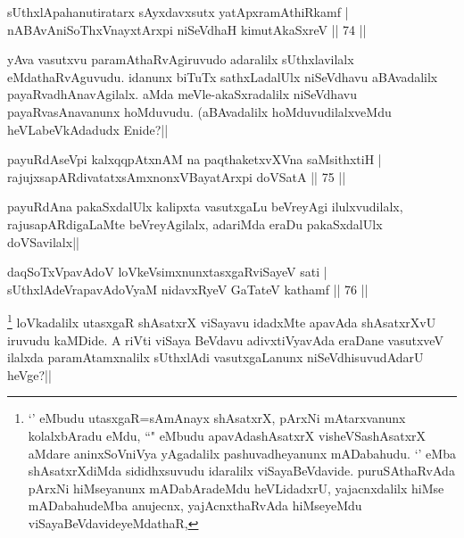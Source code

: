
\begin{shl}
sUthxlApahanutiratarx sAyxdavxsutx yatApxramAthiRkamf |\\
nABAvAniSoThxV\s nayxtArxpi niSeVdhaH kimutAkaSxreV \hfill || 74 ||
\end{shl}

\begin{artha}
yAva vasutxvu paramAthaRvAgiruvudo adaralilx sUthxlavilalx eMdathaRvAguvudu. idanunx biTuTx sathxLadalUlx niSeVdhavu aBAvadalilx payaRvadhAnavAgilalx. aMda meVle-akaSxradalilx niSeVdhavu payaRvasAnavanunx hoMduvudu. (aBAvadalilx hoMduvudilalxveMdu heVLabeVkAdadudx Enide?||
\end{artha}

\begin{shl}
payuRdAseV\s pi kalxqqpAtxnAM na paqthaketxvXVna saMsithxtiH |\\
rajujxsapARdivatatxsAmxnonxVBayatArxpi doVSatA \hfill || 75 ||
\end{shl}

\begin{artha}%
payuRdAna pakaSxdalUlx kalipxta vasutxgaLu beVreyAgi ilulxvudilalx, rajusapARdigaLaMte beVreyAgilalx, adariMda eraDu pakaSxdalUlx doVSavilalx||
\end{artha}


\begin{shl}
daqSoTxV\s pavAdoV loVkeV\s simxnunxtasxgaRviSayeV sati |\\
sUthxlAdeVrapavAdoV\s yaM nidavxRyeV GaTateV kathamf \hfill || 76 ||
\end{shl}

\begin{artha}
\footnote[1]{`\stext ' eMbudu utasxgaR=sAmAnayx shAsatxrX, pArxNi mAtarxvanunx kolalxbAradu eMdu, ``\stext " eMbudu apavAdashAsatxrX visheVSashAsatxrX aMdare aninxSoVniVya yAgadalilx pashuvadheyanunx mADabahudu. `\stext ' eMba shAsatxrXdiMda sididhxsuvudu idaralilx viSayaBeVdavide. puruSAthaRvAda pArxNi hiMseyanunx mADabAradeMdu heVLidadxrU, yajacnxdalilx hiMse mADabahudeMba anujecnx, yajAcnxthaRvAda hiMseyeMdu viSayaBeVdavideyeMdathaR,} loVkadalilx utasxgaR shAsatxrX viSayavu idadxMte apavAda shAsatxrXvU iruvudu kaMDide. A riVti viSaya BeVdavu adivxtiVyavAda  eraDane vasutxveV ilalxda paramAtamxnalilx sUthxlAdi vasutxgaLanunx niSeVdhisuvudAdarU heVge?||
\end{artha}

